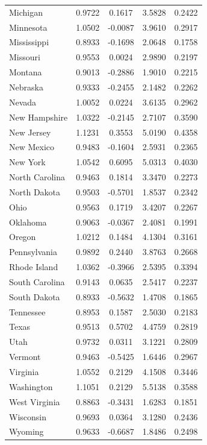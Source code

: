 \begin{table}[H]
\begin{tabular}{lcccc}
        Michigan & 0.9722 & 0.1617 & 3.5828 & 0.2422 \\
        Minnesota & 1.0502 & -0.0087 & 3.9610 & 0.2917 \\
        Mississippi & 0.8933 & -0.1698 & 2.0648 & 0.1758 \\
        Missouri & 0.9553 & 0.0024 & 2.9890 & 0.2197 \\
        Montana & 0.9013 & -0.2886 & 1.9010 & 0.2215 \\
        Nebraska & 0.9333 & -0.2455 & 2.1482 & 0.2262 \\
        Nevada & 1.0052 & 0.0224 & 3.6135 & 0.2962 \\
        New Hampshire & 1.0322 & -0.2145 & 2.7107 & 0.3590 \\
        New Jersey & 1.1231 & 0.3553 & 5.0190 & 0.4358 \\
        New Mexico & 0.9483 & -0.1604 & 2.5931 & 0.2365 \\
        New York & 1.0542 & 0.6095 & 5.0313 & 0.4030 \\
        North Carolina & 0.9463 & 0.1814 & 3.3470 & 0.2273 \\
        North Dakota & 0.9503 & -0.5701 & 1.8537 & 0.2342 \\
        Ohio & 0.9563 & 0.1719 & 3.4207 & 0.2267 \\
        Oklahoma & 0.9063 & -0.0367 & 2.4081 & 0.1991 \\
        Oregon & 1.0212 & 0.1484 & 4.1304 & 0.3161 \\
        Pennsylvania & 0.9892 & 0.2440 & 3.8763 & 0.2668 \\
        Rhode Island & 1.0362 & -0.3966 & 2.5395 & 0.3394 \\
        South Carolina & 0.9143 & 0.0635 & 2.5417 & 0.2237 \\
        South Dakota & 0.8933 & -0.5632 & 1.4708 & 0.1865 \\
        Tennessee & 0.8953 & 0.1587 & 2.5030 & 0.2183 \\
        Texas & 0.9513 & 0.5702 & 4.4759 & 0.2819 \\
        Utah & 0.9732 & 0.0311 & 3.1221 & 0.2809 \\
        Vermont & 0.9463 & -0.5425 & 1.6446 & 0.2967 \\
        Virginia & 1.0552 & 0.2129 & 4.1508 & 0.3446 \\
        Washington & 1.1051 & 0.2129 & 5.5138 & 0.3588 \\
        West Virginia & 0.8863 & -0.3431 & 1.6283 & 0.1851 \\
        Wisconsin & 0.9693 & 0.0364 & 3.1280 & 0.2436 \\
        Wyoming & 0.9633 & -0.6687 & 1.8486 & 0.2498 \\
        \bottomrule
    \end{tabular}
\end{table}
